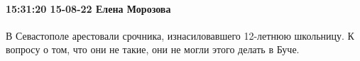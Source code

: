  
 
 
 
 

\paragraph{15:31:20 15-08-22 Елена Морозова}

В Севастополе арестовали срочника, изнасиловавшего 12-летнюю школьницу.
К вопросу о том, что они не такие, они не могли этого делать в Буче.
